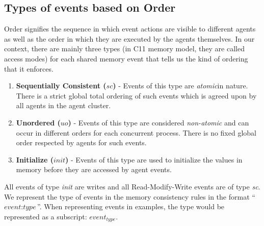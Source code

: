 
        
    
    \subsection{Types of events based on Order} 
        Order signifies the sequence in which event actions are visible to different agents as well as the order in which they are executed by the agents themselves. In our context, there are mainly three types (in C11 memory model, they are called access modes) for each shared memory event that tells us the kind of ordering that it enforces. 
        
        \begin{enumerate}
            \item \textbf{Sequentially Consistent ($sc$)} - Events of this type are \textit{atomic}\footnotemark  in nature. There is a strict global total ordering of such events which is agreed upon by all agents in the agent cluster. 
            
            \item \textbf{Unordered ($uo$)} - Events of this type are considered \textit{non-atomic} and can occur in different orders for each concurrent process. There is no fixed global order respected by agents for such events. 
            
            \item \textbf{Initialize ($init$)} - Events of this type are used to initialize the values in memory before they are accessed by agent events. 
        \end{enumerate}

        All events of type \textit{init} are writes and all Read-Modify-Write events are of type \textit{sc}.  
        We represent the type of events in the memory consistency rules in the format ``$\textit{event} : \textit{type}$''. 
        When representing events in examples, the type would be represented as a subscript: $\textit{event}_\textit{type}$. 
       

